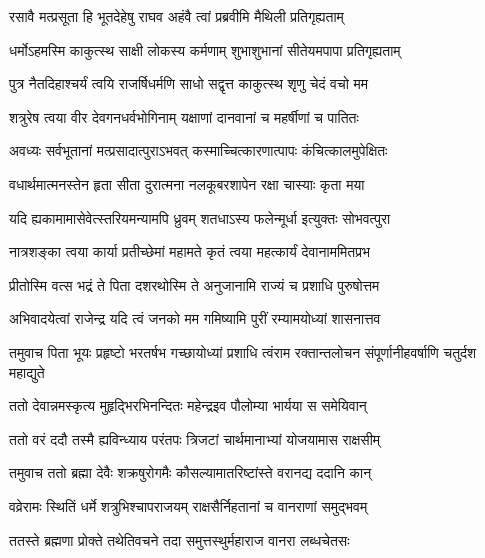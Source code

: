 

\twolineshloka
{रसावै मत्प्रसूता हि भूतदेहेषु राघव}
{अहंवै त्वां प्रब्रवीमि मैथिली प्रतिगृह्यताम्}



\twolineshloka
{धर्मोऽहमस्मि काकुत्स्थ साक्षी लोकस्य कर्मणाम्}
{शुभाशुभानां सीतेयमपापा प्रतिगृह्यताम्}



\twolineshloka
{पुत्र नैतदिहाश्चर्यं त्वयि राजर्षिधर्मणि}
{साधो सद्वृत्त काकुत्स्थ शृणु चेदं वचो मम}


\twolineshloka
{शत्रुरेष त्वया वीर देवगनधर्वभोगिनाम्}
{यक्षाणां दानवानां च महर्षीणां च पातितः}


\twolineshloka
{अवध्यः सर्वभूतानां मत्प्रसादात्पुराऽभवत्}
{कस्माच्चित्कारणात्पापः कंचित्कालमुपेक्षितः}


\twolineshloka
{वधार्थमात्मनस्तेन हृता सीता दुरात्मना}
{नलकूबरशापेन रक्षा चास्याः कृता मया}


\twolineshloka
{यदि ह्यकामामासेवेत्स्तरियमन्यामपि ध्रुवम्}
{शतधाऽस्य फलेन्मूर्धा इत्युक्तः सोभवत्पुरा}


\twolineshloka
{नात्रशङ्का त्वया कार्या प्रतीच्छेमां महामते}
{कृतं त्वया महत्कार्यं देवानाममितप्रभ}



\twolineshloka
{प्रीतोस्मि वत्स भद्रं ते पिता दशरथोस्मि ते}
{अनुजानामि राज्यं च प्रशाधि पुरुषोत्तम}



\twolineshloka
{अभिवादयेत्वां राजेन्द्र यदि त्वं जनको मम}
{गमिष्यामि पुरीं रम्यामयोध्यां शासनात्तव}



\threelineshloka
{तमुवाच पिता भूयः प्रहृष्टो भरतर्षभ}
{गच्छायोध्यां प्रशाधि त्वंराम रक्तान्तलोचन}
{संपूर्णानीहवर्षाणि चतुर्दश महाद्युते}


\twolineshloka
{ततो देवान्नमस्कृत्य मुहृद्भिरभिनन्दितः}
{महेन्द्रइव पौलोम्या भार्यया स समेयिवान्}


\twolineshloka
{ततो वरं ददौ तस्मै ह्यविन्ध्याय परंतपः}
{त्रिजटां चार्थमानाभ्यां योजयामास राक्षसीम्}


\twolineshloka
{तमुवाच ततो ब्रह्मा देवैः शक्रषुरोगमैः}
{कौसल्यामातरिष्टांस्ते वरानद्य ददानि कान्}


\twolineshloka
{वव्रेरामः स्थितिं धर्मे शत्रुभिश्चापराजयम्}
{राक्षसैर्निहतानां च वानराणां समुद्भवम्}


\twolineshloka
{ततस्ते ब्रह्मणा प्रोक्ते तथेतिवचने तदा}
{समुत्तस्थुर्महाराज वानरा लब्धचेतसः}


